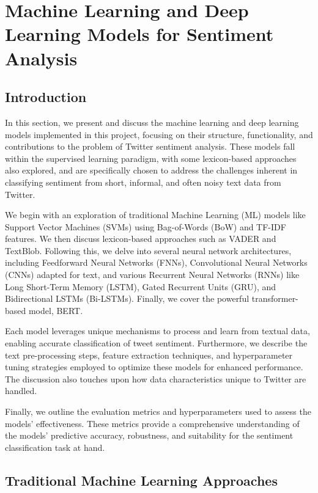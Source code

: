\section{Machine Learning and Deep Learning Models for Sentiment Analysis}
\label{sec:ML_DL_Models}

\subsection{Introduction}
In this section, we present and discuss the machine learning and deep learning models implemented in this project, focusing on their structure, functionality, and contributions to the problem of Twitter sentiment analysis. These models fall within the supervised learning paradigm, with some lexicon-based approaches also explored, and are specifically chosen to address the challenges inherent in classifying sentiment from short, informal, and often noisy text data from Twitter.

We begin with an exploration of traditional Machine Learning (ML) models like Support Vector Machines (SVMs) using Bag-of-Words (BoW) and TF-IDF features. We then discuss lexicon-based approaches such as VADER and TextBlob. Following this, we delve into several neural network architectures, including Feedforward Neural Networks (FNNs), Convolutional Neural Networks (CNNs) adapted for text, and various Recurrent Neural Networks (RNNs) like Long Short-Term Memory (LSTM), Gated Recurrent Units (GRU), and Bidirectional LSTMs (Bi-LSTMs). Finally, we cover the powerful transformer-based model, BERT.

Each model leverages unique mechanisms to process and learn from textual data, enabling accurate classification of tweet sentiment. Furthermore, we describe the text pre-processing steps, feature extraction techniques, and hyperparameter tuning strategies employed to optimize these models for enhanced performance. The discussion also touches upon how data characteristics unique to Twitter are handled.

Finally, we outline the evaluation metrics and hyperparameters used to assess the models’ effectiveness. These metrics provide a comprehensive understanding of the models’ predictive accuracy, robustness, and suitability for the sentiment classification task at hand.

\subsection{Traditional Machine Learning Approaches}

